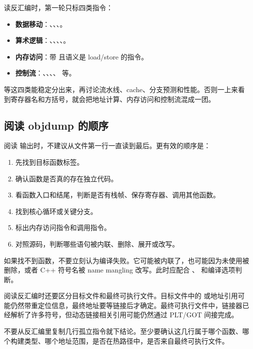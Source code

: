 读反汇编时，第一轮只标四类指令：

\begin{itemize}
  \item \textbf{数据移动}：、、、。
  \item \textbf{算术逻辑}：、、、、。
  \item \textbf{内存访问}：带  且语义是 load/store 的指令。
  \item \textbf{控制流}：、、、、 等。
\end{itemize}

等这四类能稳定分出来，再讨论流水线、cache、分支预测和性能。否则一上来看到寄存器名和方括号，就会把地址计算、内存访问和控制流混成一团。

\subsection{阅读 objdump 的顺序}

阅读  输出时，不建议从文件第一行一直读到最后。更有效的顺序是：

\begin{enumerate}
  \item 先找到目标函数标签。
  \item 确认函数是否真的存在独立代码。
  \item 看函数入口和结尾，判断是否有栈帧、保存寄存器、调用其他函数。
  \item 找到核心循环或关键分支。
  \item 标出内存访问指令和调用指令。
  \item 对照源码，判断哪些语句被内联、删除、展开或改写。
\end{enumerate}

如果找不到函数，不要立刻认为编译失败。它可能被内联了，也可能因为未使用被删除，或者 C++ 符号名被 name mangling 改写。此时应配合 、 和编译选项判断。

阅读反汇编时还要区分目标文件和最终可执行文件。目标文件中的  或地址引用可能仍然带重定位信息，最终地址要等链接后才确定。最终可执行文件中，链接器已经解析了许多符号，但动态链接相关引用可能仍然通过 PLT/GOT 间接完成。

\begin{warningbox}
不要从反汇编里复制几行孤立指令就下结论。至少要确认这几行属于哪个函数、哪个构建类型、哪个地址范围，是否在热路径中，是否来自最终可执行文件。
\end{warningbox}

